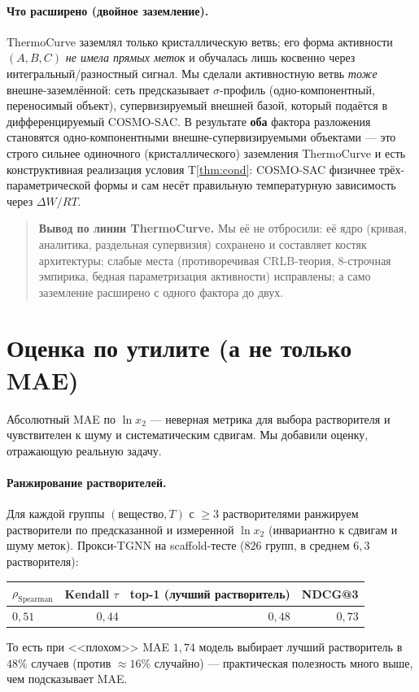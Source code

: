 \documentclass[11pt]{article}
\theoremstyle{plain}
\theoremstyle{definition}
\newcommand{\lnx}{\ln x_2}
\begin{document}
\paragraph{Что расширено (двойное заземление).} ThermoCurve заземлял только
кристаллическую ветвь; его форма активности $(A,B,C)$ \emph{не имела прямых меток}
и обучалась лишь косвенно через интегральный/разностный сигнал. Мы сделали
активностную ветвь \emph{тоже} внешне-заземлённой: сеть предсказывает
$\sigma$-профиль (одно-компонентный, переносимый объект), супервизируемый внешней
базой, который подаётся в дифференцируемый COSMO-SAC. В результате \textbf{оба}
фактора разложения становятся одно-компонентными внешне-супервизируемыми
объектами --- это строго сильнее одиночного (кристаллического) заземления
ThermoCurve и есть конструктивная реализация условия T\ref{thm:cond}: COSMO-SAC
физичнее трёх-параметрической формы и сам несёт правильную температурную
зависимость через $\Delta W/RT$.

\begin{quote}\textbf{Вывод по линии ThermoCurve.} Мы её не отбросили: её ядро
(кривая, аналитика, раздельная супервизия) сохранено и составляет костяк
архитектуры; слабые места (противоречивая CRLB-теория, $8$-строчная эмпирика,
бедная параметризация активности) исправлены; а само заземление расширено с
одного фактора до двух.\end{quote}

\section{Оценка по утилите (а не только MAE)}
\label{sec:utility}
Абсолютный MAE по $\lnx$ --- неверная метрика для выбора растворителя и
чувствителен к шуму и систематическим сдвигам. Мы добавили оценку, отражающую
реальную задачу.

\paragraph{Ранжирование растворителей.} Для каждой группы $(\text{вещество},T)$
с $\geq3$ растворителями ранжируем растворители по предсказанной и измеренной
$\lnx$ (инвариантно к сдвигам и шуму меток). Прокси-TGNN на scaffold-тесте
($826$ групп, в среднем $6{,}3$ растворителя):
\begin{center}
\begin{tabular}{lrrr}
\toprule
$\rho_{\text{Spearman}}$ & Kendall $\tau$ & top-1 (лучший растворитель) & NDCG@3 \\
\midrule
$0{,}51$ & $0{,}44$ & $0{,}48$ & $0{,}73$ \\
\bottomrule
\end{tabular}
\end{center}
То есть при <<плохом>> MAE $1{,}74$ модель выбирает лучший растворитель в $48\%$
случаев (против $\approx16\%$ случайно) --- практическая полезность много выше,
чем подсказывает MAE.
\end{document}
